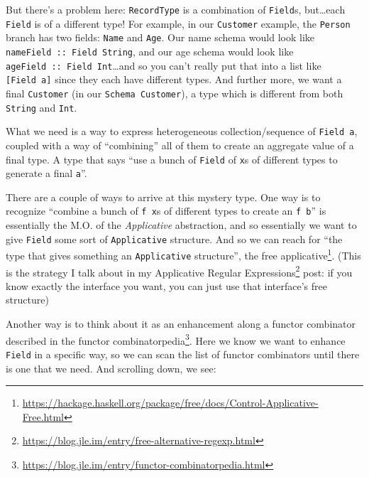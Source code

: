 \documentclass[]{article}
\renewcommand{\href}[2]{#2\footnote{\url{#1}}}
\begin{document}
But there's a problem here: \texttt{RecordType} is a combination of
\texttt{Field}s, but\ldots each \texttt{Field} is of a different type! For
example, in our \texttt{Customer} example, the \texttt{Person} branch has two
fields: \texttt{Name} and \texttt{Age}. Our name schema would look like
\texttt{nameField\ ::\ Field\ String}, and our age schema would look like
\texttt{ageField\ ::\ Field\ Int}\ldots and so you can't really put that into a
list like \texttt{{[}Field\ a{]}} since they each have different types. And
further more, we want a final \texttt{Customer} (in our
\texttt{Schema\ Customer}), a type which is different from both \texttt{String}
and \texttt{Int}.

What we need is a way to express heterogeneous collection/sequence of
\texttt{Field\ a}, coupled with a way of ``combining'' all of them to create an
aggregate value of a final type. A type that says ``use a bunch of
\texttt{Field} of \texttt{x}s of different types to generate a final
\texttt{a}''.

There are a couple of ways to arrive at this mystery type. One way is to
recognize ``combine a bunch of \texttt{f\ x}s of different types to create an
\texttt{f\ b}'' is essentially the M.O. of the \emph{Applicative} abstraction,
and so essentially we want to give \texttt{Field} some sort of
\texttt{Applicative} structure. And so we can reach for ``the type that gives
something an \texttt{Applicative} structure'', the
\href{https://hackage.haskell.org/package/free/docs/Control-Applicative-Free.html}{free
applicative}. (This is the strategy I talk about in my
\href{https://blog.jle.im/entry/free-alternative-regexp.html}{Applicative
Regular Expressions} post: if you know exactly the interface you want, you can
just use that interface's free structure)

Another way is to think about it as an enhancement along a functor combinator
described in the
\href{https://blog.jle.im/entry/functor-combinatorpedia.html}{functor
combinatorpedia}. Here we know we want to enhance \texttt{Field} in a specific
way, so we can scan the list of functor combinators until there is one that we
need. And scrolling down, we see:
\end{document}
